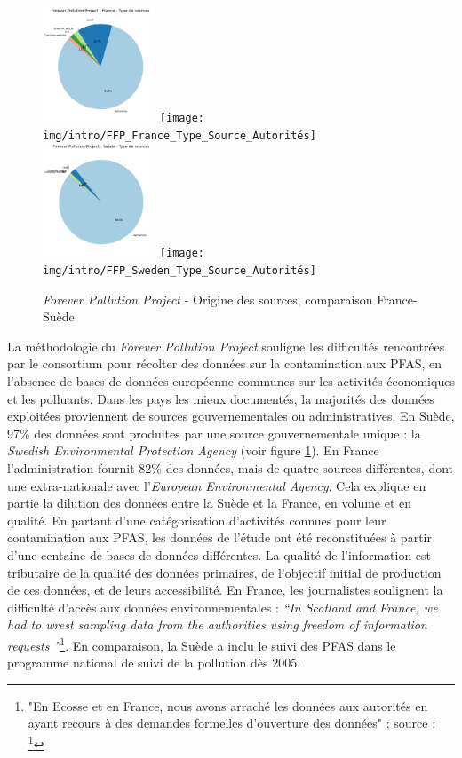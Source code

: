 \documentclass[a4paper,twoside,12pt]{book}
\begin{document}
\begin{figure}[!h]
\centering 
\includegraphics[width=0.3\textwidth]{img/intro/FFP_France_Type_Sources}
\texttt{[image: img/intro/FFP\_France\_Type\_Source\_Autorités]}
\includegraphics[width=0.3\textwidth]{img/intro/FFP_Sweden_Type_Sources}
\texttt{[image: img/intro/FFP\_Sweden\_Type\_Source\_Autorités]}
\caption{\textit{Forever Pollution Project} - Origine des sources, comparaison France-Suède}
\label{fig:FPP_Comparaison_Suede_France}
\end{figure}

La méthodologie du \textit{Forever Pollution Project} souligne les difficultés rencontrées par le consortium pour récolter des données sur la contamination aux PFAS, en l'absence de bases de données européenne communes sur les activités économiques et les polluants. Dans les pays les mieux documentés, la majorités des données exploitées proviennent de sources gouvernementales ou administratives. En Suède, 97\% des données sont produites par une source gouvernementale unique : la \textit{Swedish Environmental Protection Agency} (voir figure \ref{fig:FPP_Comparaison_Suede_France}). En France l'administration fournit 82\% des données, mais de quatre sources différentes, dont une extra-nationale avec l'\textit{European Environmental Agency}. Cela explique en partie la dilution des données entre la Suède et la France, en volume et en qualité. En partant d'une catégorisation d'activités connues pour leur contamination aux PFAS, les données de l'étude ont été reconstituées à partir d'une centaine de bases de données différentes. La qualité de l'information est tributaire de la qualité des données primaires, de l'objectif initial de production de ces données, et de leurs accessibilité. En France, les journalistes soulignent la difficulté d'accès aux données environnementales :  \textit{\textquotedblleft In Scotland and France, we had to wrest sampling data from the authorities using freedom of information requests \textquotedblright }\footnote{"En Ecosse et en France, nous avons arraché les données aux autorités en ayant recours à des demandes formelles d'ouverture des données" ; source : \footcite{collectif_de_journalistes_forever_2023}}. En comparaison, la Suède a inclu le suivi des PFAS dans le programme national de suivi de la pollution dès 2005. 
\end{document}
